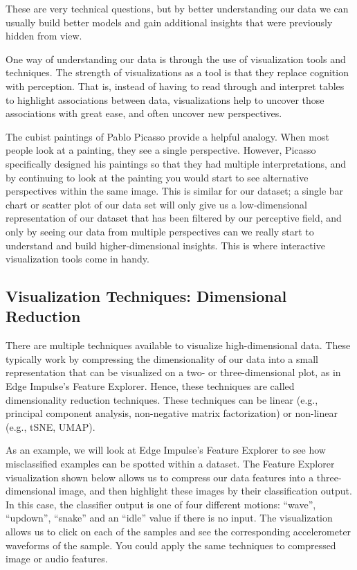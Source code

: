     These are very technical questions, but by better understanding our data we can usually build better models and gain additional insights that were previously hidden from view. 
    
    One way of understanding our data is through the use of visualization tools and techniques. The strength of visualizations as a tool is that they replace cognition with perception. That is, instead of having to read through and interpret tables to highlight associations between data, visualizations help to uncover those associations with great ease, and often uncover new perspectives.
    
    The cubist paintings of Pablo Picasso provide a helpful analogy. When most people look at a painting, they see a single perspective. However, Picasso specifically designed his paintings so that they had multiple interpretations, and by continuing to look at the painting you would start to see alternative perspectives within the same image. This is similar for our dataset; a single bar chart or scatter plot of our data set will only give us a low-dimensional representation of our dataset that has been filtered by our perceptive field, and only by seeing our data from multiple perspectives can we really start to understand and build higher-dimensional insights. This is where interactive visualization tools come in handy.
    
\subsection{Visualization Techniques: Dimensional Reduction}

    There are multiple techniques available to visualize high-dimensional data. These typically work by compressing the dimensionality of our data into a small representation that can be visualized on a two- or three-dimensional plot, as in Edge Impulse’s Feature Explorer. Hence, these techniques are called dimensionality reduction techniques. These techniques can be linear (e.g., principal component analysis, non-negative matrix factorization) or non-linear (e.g., tSNE, UMAP).
    
    As an example, we will look at Edge Impulse’s Feature Explorer to see how misclassified examples can be spotted within a dataset. The Feature Explorer visualization shown below allows us to compress our data features into a three-dimensional image, and then highlight these images by their classification output. In this case, the classifier output is one of four different motions: “wave”, “updown”, “snake” and an “idle” value if there is no input. The visualization allows us to click on each of the samples and see the corresponding accelerometer waveforms of the sample. You could apply the same techniques to compressed image or audio features.
    
